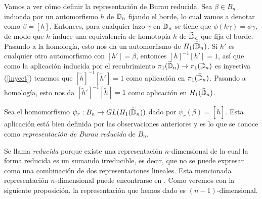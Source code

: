\documentclass[TFG.tex]{subfiles}
\begin{document}


Vamos a ver cómo definir la representación de Burau reducida. Sea $\beta\in B_n$ inducida por un automorfismo $h$ de $\mathbb{D}_n$ fijando el borde, lo cual vamos a denotar como $\beta=[h]$. Entonces, para cualquier lazo $\gamma$ en $\mathbb{D}_n$ se tiene que $\phi(h\gamma)=\phi\gamma$, de modo que $h$ induce una equivalencia de homotopía \cite{Hatcher} $\tilde{h}$ de $\widetilde{\mathbb{D}}_n$ que fija el borde. Pasando a la homología, esto nos da un automorfismo de $H_1(\widetilde{\mathbb{D}}_n)$. Si $h'$ es cualquier otro automorfismo con $[h']=\beta$, entonces $[h]^{-1}[h']=1$, así que como la aplicación inducida por el recubrimiento $\pi_1(\widetilde{\mathbb{D}}_n)\to\pi_1(\mathbb{D}_n)$ es inyectiva (\ref{inyect}) tenemos que $[\tilde{h}]^{-1}[\tilde{h}']=1$ como aplicación en $\pi_1(\widetilde{\mathbb{D}}_n)$. Pasando a homología, esto nos da $[\tilde{h}']^{-1}[\tilde{h}]=1$ como aplicación en $H_1(\widetilde{\mathbb{D}}_n)$. 






\begin{defi}
Sea el homomorfismo $\psi_r:B_n\to GL(H_1(\widetilde{\mathbb{D}}_n))$ dado por $\psi_r(\beta)=[\tilde{h}]$. Esta aplicación está bien definida por las observaciones anteriores y es lo que se conoce como \emph{representación de Burau reducida} de $B_n$.
\end{defi}

Se llama \emph{reducida} porque existe una representación $n$-dimensional de la cual la forma reducida es un sumando irreducible, es decir, que no se puede expresar como una combinación de dos representaciones lineales. Esta mencionada representación $n$-dimensional puede encontrarse en \cite{thesis}. Como veremos con la siguiente proposición, la representación que hemos dado es $(n-1)$-dimensional.

\end{document}
